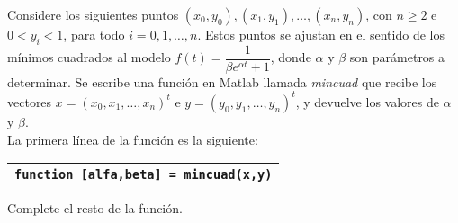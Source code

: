 \begin{pregunta}
\begin{cuerpo}
Considere los siguientes puntos $(x_0,y_0), (x_1,y_1), \ldots, (x_n,y_n)$, con $n\geq2$ e $0<y_i<1$, para todo $i=0,1,\ldots, n$. Estos puntos se ajustan en el sentido de los m\'inimos cuadrados al modelo $f(t)=\dfrac{1}{\beta e^{\alpha t}+1}$, donde $\alpha$ y $\beta$ son par\'ametros a determinar. Se escribe una funci\'on en Matlab llamada \textit{mincuad} que recibe los vectores $x = (x_0, x_1 , \ldots, x_n)^t$ e $y = (y_0, y_1 , \ldots, y_n)^t$, y devuelve los valores de $\alpha$ y $\beta$.\\

La primera l\'inea de la funci\'on es la siguiente:
\vspace{0.5cm}

\begin{tabular}{|l|}
\hline
\verb"function [alfa,beta] = mincuad(x,y)"\\
\hline
\end{tabular}

\vspace{0.5cm}
Complete el resto de la funci\'on.


\end{cuerpo}


\justificacion{15cm}
\end{pregunta}
